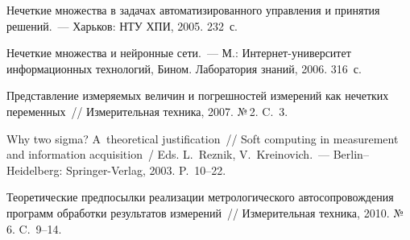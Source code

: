 \begin{multicols}{2}
{{\begin{thebibliography}{99}
\columnbreak
{}
Нечеткие множества в задачах автоматизированного управления и принятия 
решений.~--- Харьков: НТУ ХПИ, 2005. 232~с.

Нечеткие множества и нейронные сети.~--- М.: 
Ин\-тер\-нет-уни\-вер\-си\-тет информационных технологий, Бином. 
Лаборатория знаний, 2006. 316~с.

Представление измеряемых величин и погрешностей измерений как нечетких 
переменных~// Измерительная техника, 2007. №\,2. C.~3.

Why two sigma? A~theoretical justification~// Soft computing in measurement and 
information acquisition~/ Eds. L.~Reznik, V.~Kreinovich.~--- Berlin--Heidelberg: 
Springer-Verlag, 2003. P.~10--22.

\label{end\stat}

Теоретические предпосылки реализации метрологического автосопровождения 
программ обработки результатов измерений~// Измерительная техника, 2010. 
№\,6. C.~9--14.
 \end{thebibliography}
}
}
\end{multicols}